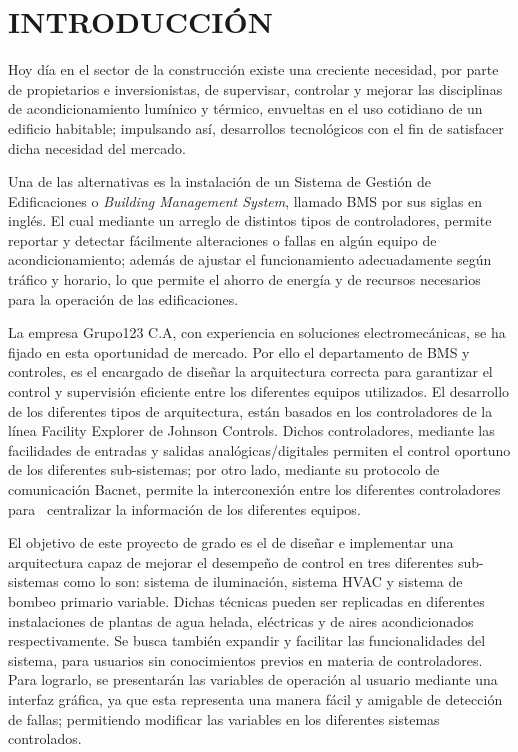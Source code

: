 \chapter*{INTRODUCCIÓN}
\thispagestyle{empty}
Hoy día en el sector de la construcción existe una creciente necesidad, por parte de propietarios e inversionistas, de supervisar, controlar y mejorar las disciplinas de acondicionamiento lumínico y térmico, envueltas en el uso cotidiano de un edificio habitable; impulsando así, desarrollos tecnológicos con el fin de satisfacer dicha necesidad del mercado. 

Una de las alternativas es la instalación de un Sistema de Gestión de Edificaciones o \textit{Building Management System}, llamado BMS por sus siglas en inglés. El cual mediante un arreglo de distintos tipos de controladores, permite reportar y detectar fácilmente alteraciones o fallas en algún equipo de acondicionamiento; además de ajustar el funcionamiento adecuadamente según tráfico y horario, lo que permite el ahorro de energía y de recursos necesarios para la operación de las edificaciones.

La empresa Grupo123 C.A, con experiencia en soluciones electromecánicas, se ha fijado en esta oportunidad de mercado. Por ello el departamento de BMS y controles, es el encargado de diseñar la arquitectura correcta para garantizar el control y supervisión eficiente entre los diferentes equipos utilizados. El desarrollo de los diferentes tipos de arquitectura, están basados en los controladores de la línea Facility Explorer de Johnson Controls. Dichos controladores, mediante las facilidades de entradas y salidas analógicas/digitales permiten el control oportuno de los diferentes sub-sistemas; por otro lado, mediante su protocolo de comunicación Bacnet, permite la interconexión entre los diferentes controladores para  centralizar la información de los diferentes equipos.

El objetivo de este proyecto de grado es el de diseñar e implementar una arquitectura capaz de mejorar el desempeño de control en tres diferentes sub-sistemas como lo son: sistema de iluminación, sistema HVAC y sistema de bombeo primario variable. Dichas técnicas pueden ser replicadas en diferentes instalaciones de plantas de agua helada, eléctricas y de aires acondicionados respectivamente. Se busca también expandir y facilitar las funcionalidades del sistema, para usuarios sin conocimientos previos en materia de controladores. Para lograrlo, se presentarán las variables de operación al usuario mediante una interfaz gráfica, ya que esta representa una manera fácil y amigable de detección de fallas; permitiendo modificar las variables en los diferentes sistemas controlados.\newline

